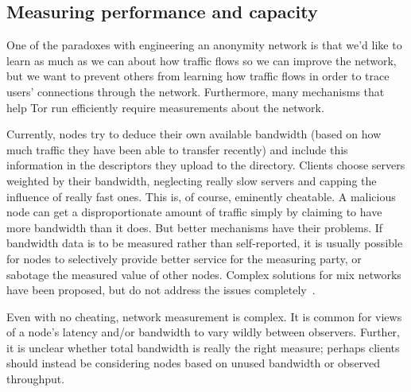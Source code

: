 \documentclass{llncs}
\begin{document}
\subsection{Measuring performance and capacity}
\label{subsec:performance}

One of the paradoxes with engineering an anonymity network is that we'd like
to learn as much as we can about how traffic flows so we can improve the
network, but we want to prevent others from learning how traffic flows in
order to trace users' connections through the network.  Furthermore, many
mechanisms that help Tor run efficiently
require measurements about the network.

Currently, nodes try to deduce their own available bandwidth (based on how
much traffic they have been able to transfer recently) and include this
information in the descriptors they upload to the directory. Clients
choose servers weighted by their bandwidth, neglecting really slow
servers and capping the influence of really fast ones.
%
This is, of course, eminently cheatable.  A malicious node can get a
disproportionate amount of traffic simply by claiming to have more bandwidth
than it does.  But better mechanisms have their problems.  If bandwidth data
is to be measured rather than self-reported, it is usually possible for
nodes to selectively provide better service for the measuring party, or
sabotage the measured value of other nodes.  Complex solutions for
mix networks have been proposed, but do not address the issues
completely~\cite{mix-acc,casc-rep}.

Even with no cheating, network measurement is complex.  It is common
for views of a node's latency and/or bandwidth to vary wildly between
observers.  Further, it is unclear whether total bandwidth is really
the right measure; perhaps clients should instead be considering nodes
based on unused bandwidth or observed throughput.


\end{document}
